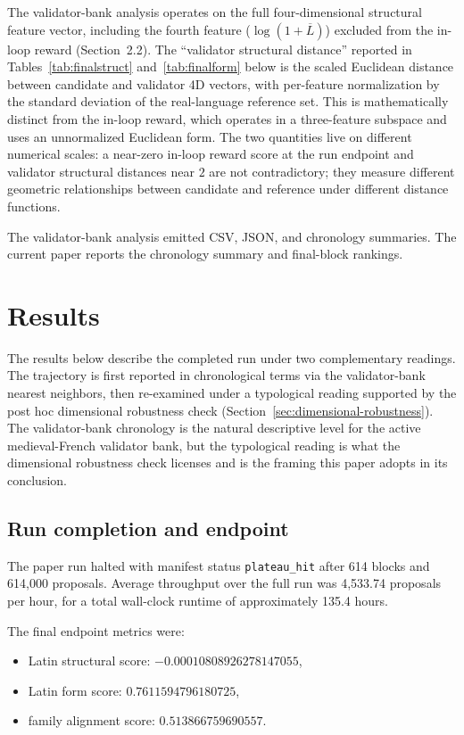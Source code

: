 \documentclass[11pt]{article}
\begin{document}
The validator-bank analysis operates on the full four-dimensional
structural feature vector, including the fourth feature
($\log(1 + \overline{L})$) excluded from the in-loop reward (Section~2.2).
The ``validator structural distance'' reported in
Tables~\ref{tab:finalstruct} and~\ref{tab:finalform} below is the scaled
Euclidean distance between candidate and validator 4D vectors, with
per-feature normalization by the standard deviation of the real-language
reference set. This is mathematically distinct from the in-loop reward,
which operates in a three-feature subspace and uses an unnormalized
Euclidean form. The two quantities live on different numerical scales:
a near-zero in-loop reward score at the run endpoint and validator
structural distances near $2$ are not contradictory; they measure
different geometric relationships between candidate and reference under
different distance functions.

The validator-bank analysis emitted CSV, JSON, and chronology summaries. The
current paper reports the chronology summary and final-block rankings.

\section{Results}

The results below describe the completed run under two complementary readings.
The trajectory is first reported in chronological terms via the validator-bank
nearest neighbors, then re-examined under a typological reading supported by
the post hoc dimensional robustness check
(Section~\ref{sec:dimensional-robustness}). The validator-bank chronology is
the natural descriptive level for the active medieval-French validator bank,
but the typological reading is what the dimensional robustness check licenses
and is the framing this paper adopts in its conclusion.

\subsection{Run completion and endpoint}

The paper run halted with manifest status \texttt{plateau\_hit} after 614
blocks and 614{,}000 proposals. Average throughput over the full run was
4{,}533.74 proposals per hour, for a total wall-clock runtime of
approximately 135.4 hours.

The final endpoint metrics were:

\begin{itemize}
    \item Latin structural score: $-0.00010808926278147055$,
    \item Latin form score: $0.7611594796180725$,
    \item family alignment score: $0.513866759690557$.
\end{itemize}
\end{document}

